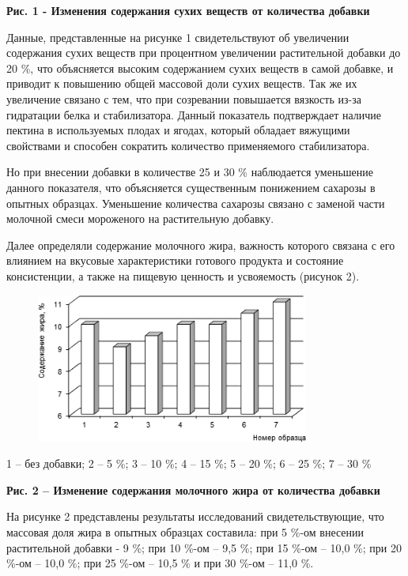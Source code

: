 {{{\bfseries Рис. 1 - Изменения содержания сухих веществ от количества
добавки}

Данные, представленные на рисунке 1 свидетельствуют об увеличении
содержания сухих веществ при процентном увеличении растительной добавки
до 20 \%, что объясняется высоким содержанием сухих веществ в самой
добавке, и приводит к повышению общей массовой доли сухих веществ. Так
же их увеличение связано с тем, что при созревании повышается вязкость
из-за гидратации белка и стабилизатора. Данный показатель подтверждает
наличие пектина в используемых плодах и ягодах, который обладает
вяжущими свойствами и способен сократить количество применяемого
стабилизатора.

Но при внесении добавки в количестве 25 и 30 \% наблюдается уменьшение
данного показателя, что объясняется существенным понижением сахарозы в
опытных образцах. Уменьшение количества сахарозы связано с заменой части
молочной смеси мороженого на растительную добавку.

Далее определяли содержание молочного жира, важность которого связана с
его влиянием на вкусовые характеристики готового продукта и состояние
консистенции, а также на пищевую ценность и усвояемость (рисунок 2).

\begin{figure}[H]
	\centering
	\includegraphics[width=0.8\textwidth]{media/pish2/image11}
	\caption*{}
\end{figure}


1 -- без добавки; 2 -- 5 \%; 3 -- 10 \%; 4 -- 15 \%; 5 -- 20 \%; 6 -- 25
\%; 7 -- 30 \%

{\bfseries Рис. 2 -- Изменение содержания молочного жира от количества
добавки}

На рисунке 2 представлены результаты исследований свидетельствующие, что
массовая доля жира в опытных образцах составила: при 5 \%-ом внесении
растительной добавки - 9 \%; при 10 \%-ом -- 9,5 \%; при 15 \%-ом --
10,0 \%; при 20 \%-ом -- 10,0 \%; при 25 \%-ом -- 10,5 \% и при 30 \%-ом
-- 11,0 \%.

}}
